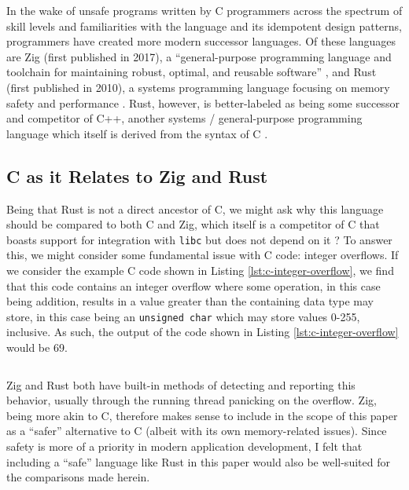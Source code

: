 \documentclass[conference]{IEEEtran}
\newenvironment{code}{\captionsetup{type=listing}}{}
\begin{document}
In the wake of unsafe programs written by C programmers across the spectrum of
skill levels and familiarities with the language and its idempotent design
patterns, programmers have created more modern successor languages. Of these
languages are Zig (first published in 2017), a ``general-purpose programming
language and toolchain for maintaining robust, optimal, and reusable software''
\cite{zigGithubRepo}, and Rust (first published in 2010), a systems programming
language focusing on memory safety and performance \cite{bugden2022rust}. Rust,
however, is better-labeled as being some successor and competitor of C++,
another systems / general-purpose programming language which itself is derived
from the syntax of C \cite{bugden2022rust}.

\subsection{C as it Relates to Zig and Rust}
Being that Rust is not a direct ancestor of C, we might ask why this language
should be compared to both C and Zig, which itself is a competitor of C that
boasts support for integration with \texttt{libc} but does not depend on it
\cite{zig2025overview}? To answer this, we might consider some fundamental issue
with C code: integer overflows. If we consider the example C code shown in
Listing \ref{lst:c-integer-overflow}, we find that this code contains an
integer overflow where some operation, in this case being addition, results in a
value greater than the containing data type may store, in this case being an
\texttt{unsigned char} which may store values 0-255, inclusive. As such, the
output of the code shown in Listing \ref{lst:c-integer-overflow} would be 69.

\begin{code}
    \medskip
    \inputminted{c}{../code-examples/c/integer-overflow.c}
    \label{lst:c-integer-overflow}
    \medskip
\end{code}

Zig and Rust both have built-in methods of detecting and reporting this behavior,
usually through the running thread panicking on the overflow. Zig, being more akin
to C, therefore makes sense to include in the scope of this paper as a ``safer''
alternative to C (albeit with its own memory-related issues). Since safety is more
of a priority in modern application development, I felt that including a ``safe''
language like Rust in this paper would also be well-suited for the comparisons made
herein.
\end{document}
